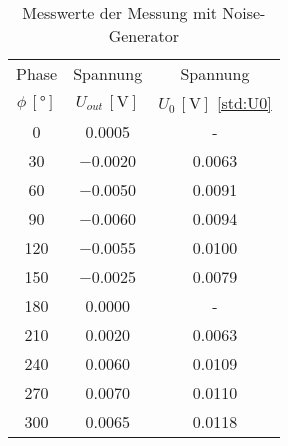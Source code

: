 \begin{table}[!h]
	\centering
	\begin{tabular}{|c|c|c|}
		\hline
		Phase & Spannung & Spannung\\
		$\phi\,[\si{\degree}]$ & $U_{out}\,[\si{\volt}]$ & $U_{0}\,[\si{\volt}]$ \cref{std:U0}\\\hline\hline
		\num{0}  & \num{0.0005}  & - \\
		\num{30}  & \num{-0.0020}  & \num{0.0063} \\
		\num{60}  & \num{-0.0050}  & \num{0.0091} \\
		\num{90}  & \num{-0.0060}  & \num{0.0094} \\
		\num{120}  & \num{-0.0055}  & \num{0.0100} \\
		\num{150}  & \num{-0.0025}  & \num{0.0079} \\
		\num{180}  & \num{0.0000}  & - \\
		\num{210}  & \num{0.0020}  & \num{0.0063} \\
		\num{240}  & \num{0.0060}  & \num{0.0109} \\
		\num{270}  & \num{0.0070}  & \num{0.0110} \\
		\num{300}  & \num{0.0065}  & \num{0.0118} \\
		\hline
	\end{tabular}
	\caption{Messwerte der Messung mit Noise-Generator \label{tab:mitNoise}}
\end{table}